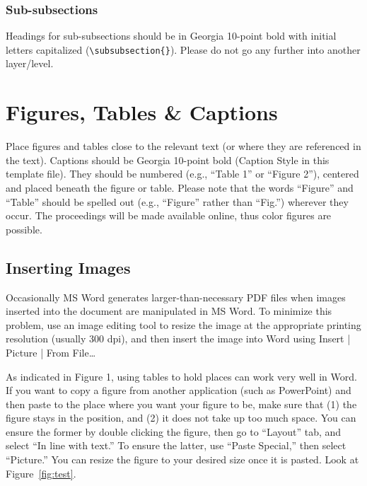 \documentclass{icis}
\begin{document}
\subsubsection{Sub-subsections}
Headings for sub-subsections should be in Georgia 10-point bold with initial
letters capitalized (\texttt{\textbackslash subsubsection\{\}}). Please do not
go any further into another layer/level.

\section{Figures, Tables \& Captions}
Place figures and tables close to the relevant text (or where they are
referenced in the text).  Captions should be Georgia 10-point bold (Caption
Style in this template file).  They should be numbered (e.g., ``Table 1'' or
``Figure 2''), centered and placed beneath the figure or table.  Please note that
the words ``Figure'' and ``Table'' should be spelled out (e.g., ``Figure'' rather than
``Fig.'') wherever they occur. The proceedings will be made available online, thus
color figures are possible.

\subsection{Inserting Images}
Occasionally MS Word generates larger-than-necessary PDF files when images
inserted into the document are manipulated in MS Word. To minimize this
problem, use an image editing tool to resize the image at the appropriate
printing resolution (usually 300 dpi), and then insert the image into Word using
Insert | Picture | From File\ldots

As indicated in Figure 1, using tables to hold places can work very well in
Word. If you want to copy a figure from another application (such as PowerPoint)
and then paste to the place where you want your figure to be, make sure that (1)
the figure stays in the position, and (2) it does not take up too much
space. You can ensure the former by double clicking the figure, then go to
``Layout'' tab, and select ``In line with text.'' To ensure the latter, use ``Paste
Special,'' then select ``Picture.'' You can resize the figure to your desired size
once it is pasted. Look at Figure~\ref{fig:test}.
\end{document}
